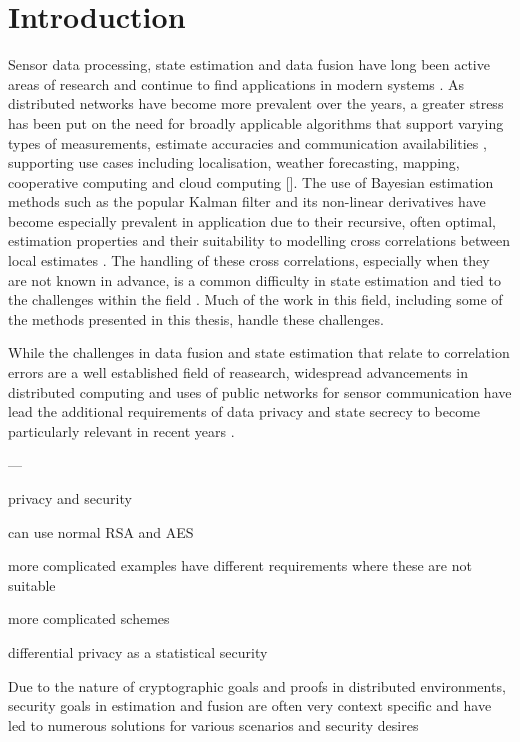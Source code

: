 
\chapter{Introduction}
Sensor data processing, state estimation and data fusion have long been active areas of research and continue to find applications in modern systems \cite{andersonOptimalFiltering1979,simonOptimalStateEstimation2006}. As distributed networks have become more prevalent over the years, a greater stress has been put on the need for broadly applicable algorithms that support varying types of measurements, estimate accuracies and communication availabilities \cite{mutambaraDecentralizedEstimationControl1998,ligginsDistributedDataFusion2012}, supporting use cases including localisation, weather forecasting, mapping, cooperative computing and cloud computing []. The use of Bayesian estimation methods such as the popular Kalman filter and its non-linear derivatives have become especially prevalent in application due to their recursive, often optimal, estimation properties and their suitability to modelling cross correlations between local estimates \cite{chongFortyYearsDistributed2017,haugBayesianEstimationTracking2012}. The handling of these cross correlations, especially when they are not known in advance, is a common difficulty in state estimation and tied to the challenges within the field \cite{noackTreatmentDependentInformation2017}. Much of the work in this field, including some of the methods presented in this thesis, handle these challenges.

While the challenges in data fusion and state estimation that relate to correlation errors are a well established field of reasearch, widespread advancements in distributed computing and uses of public networks for sensor communication have lead the additional requirements of data privacy and state secrecy to become particularly relevant in recent years \cite{brennerSecretProgramExecution2011,renSecurityChallengesPublic2012}.

---

privacy and security 

can use normal RSA and AES

more complicated examples have different requirements where these are not suitable

more complicated schemes

differential privacy as a statistical security

Due to the nature of cryptographic goals and proofs in distributed environments, security goals in estimation and fusion are often very context specific and have led to numerous solutions for various scenarios and security desires

